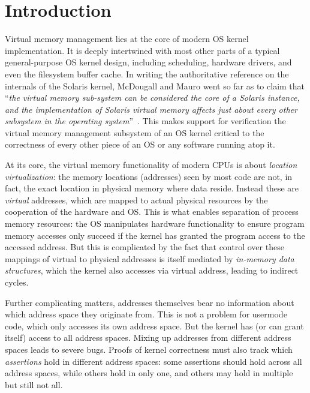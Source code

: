 \section{Introduction}
\label{sec:intro}
Virtual memory management lies at the core of modern OS kernel implementation. It is deeply intertwined with most other parts of a typical general-purpose OS kernel design, including scheduling, hardware drivers, and even the filesystem buffer cache. In writing the authoritative reference on the internals of the Solaris kernel, McDougall and Mauro went so far as to claim that ``\emph{the virtual memory sub-system can be considered the core of a Solaris instance, and the implementation of Solaris virtual memory affects just about every other subsystem in the operating system}''~\cite{mcdougall2006solaris}.
This makes support for verification the virtual memory management subsystem of an OS kernel critical to the correctness of every other piece of an OS or any software running atop it.

At its core, the virtual memory functionality of modern CPUs is about \emph{location virtualization}: the memory locations
(addresses) seen by most code are not, in fact, the exact location in physical memory where data reside. Instead these 
are \emph{virtual} addresses, which are mapped to actual physical resources by the cooperation of the hardware and OS. 
This is what enables separation of process memory resources:
the OS manipulates hardware functionality to ensure 
program memory accesses only succeed if the kernel has granted the program access to the accessed address.
But this is complicated by the fact that 
control over these mappings of virtual to physical addresses is itself mediated by \emph{in-memory data structures}, 
which the kernel also accesses via virtual address, leading to indirect cycles.

Further complicating matters, addresses themselves bear no information about which address space they originate 
from. 
This is not a problem for usermode code, which only accesses its own address space.
But the kernel has
(or can grant itself) access to all address spaces. Mixing up addresses from different address spaces leads to severe bugs.
Proofs of kernel correctness must also track which \emph{assertions} hold in different address spaces:
some assertions should hold across all address spaces, while others hold in only one, and others may hold in 
multiple but still not all.

